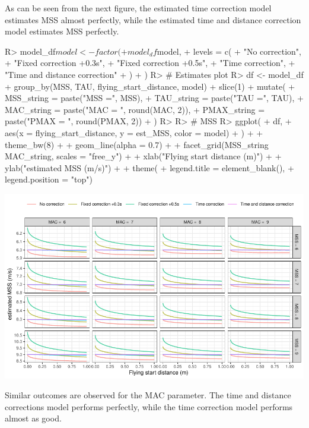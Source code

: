 \documentclass[
]{jss}
\begin{document}
As can be seen from the next figure, the estimated time correction model estimates MSS almost perfectly, while the estimated time and distance correction model estimates MSS perfectly.

\begin{CodeChunk}
\begin{CodeInput}
R> model_df$model <- factor(
+   model_df$model,
+   levels = c(
+     "No correction",
+     "Fixed correction +0.3s",
+     "Fixed correction +0.5s",
+     "Time correction",
+     "Time and distance correction"
+   )
+ )
R> # Estimates plot
R> df <- model_df %
+   group_by(MSS, TAU, flying_start_distance, model) %
+   slice(1) %
+   mutate(
+     MSS_string = paste("MSS =", MSS),
+     TAU_string = paste("TAU =", TAU),
+     MAC_string = paste("MAC = ", round(MAC, 2)),
+     PMAX_string = paste("PMAX = ", round(PMAX, 2))
+   )
R> 
R> # MSS
R> ggplot(
+   df,
+   aes(x = flying_start_distance, y = est_MSS, color = model)
+ ) +
+   theme_bw(8) +
+   geom_line(alpha = 0.7) +
+   facet_grid(MSS_string ~ MAC_string, scales = "free_y") +
+   xlab("Flying start distance (m)") +
+   ylab("estimated MSS (m/s)") +
+   theme(
+     legend.title = element_blank(),
+     legend.position = "top")
\end{CodeInput}


\begin{center}\includegraphics[width=1\linewidth]{paper_files/figure-latex/unnamed-chunk-32-1} \end{center}

\end{CodeChunk}

Similar outcomes are observed for the MAC parameter. The time and distance corrections model performs perfectly, while the time correction model performs almost as good.
\end{document}
